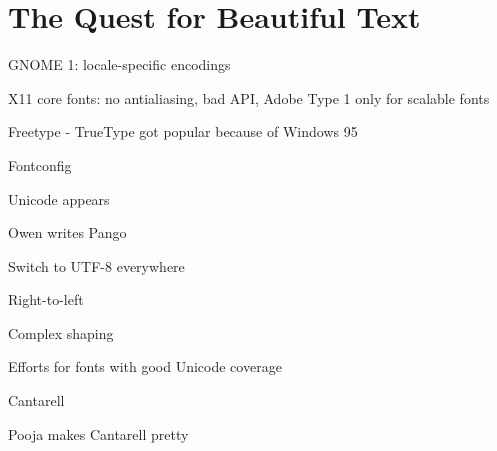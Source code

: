 \chapter{The Quest for Beautiful Text}

GNOME 1: locale-specific encodings

X11 core fonts: no antialiasing, bad API, Adobe Type 1 only for
scalable fonts

Freetype - TrueType got popular because of Windows 95

Fontconfig

Unicode appears

Owen writes Pango

Switch to UTF-8 everywhere

Right-to-left

Complex shaping

Efforts for fonts with good Unicode coverage

Cantarell

Pooja makes Cantarell pretty
